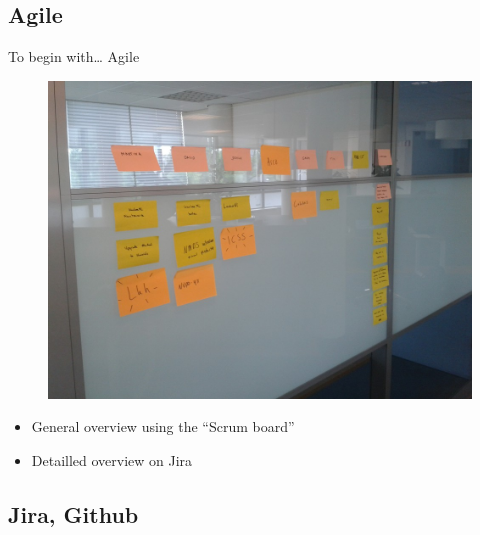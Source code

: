 \documentclass[10pt,a4paper]{beamer}
\begin{document}
\subsection{Agile}

\begin{frame}{To begin with… Agile}

	\begin{figure}[htp]
	\centering
	\includegraphics[scale=.15]{../img/agile1.jpg}
	 \label{fig.agile1}
	\end{figure}

  \begin{itemize}
    \item General overview using the ``Scrum board''
    \item Detailled overview on Jira
  \end{itemize}
  
\end{frame}

\subsection{Jira, Github}
\end{document}
